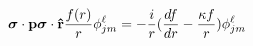 \begin{equation}
{\mbox{\boldmath $\sigma$}}\cdot{\bf p}{\mbox{\boldmath $\sigma$}}
\cdot{\bf{\hat r}}{f(r)\over r}\phi^{\ell}_{jm}=-{i\over r}({df\over dr}-
{\kappa f\over r})\phi^{\ell}_{jm}
\end{equation}

